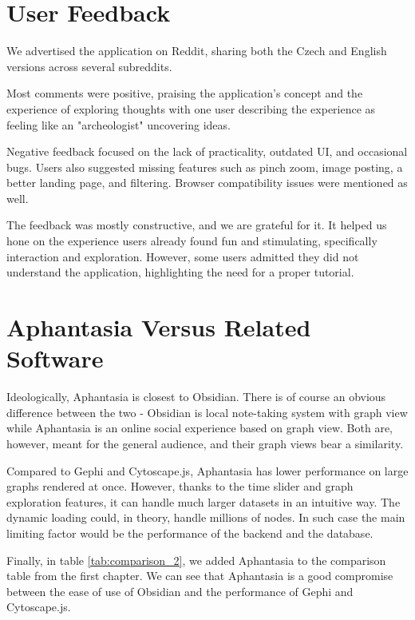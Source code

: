 \section{User Feedback}
We advertised the application on Reddit, sharing both the Czech and English versions across several subreddits.

Most comments were positive, praising the application's concept and the experience of exploring thoughts
with one user describing the experience as feeling like an "archeologist" uncovering ideas.

Negative feedback focused on the lack of practicality, outdated UI, and occasional bugs.
Users also suggested missing features such as pinch zoom, image posting, a better landing page, and filtering.
Browser compatibility issues were mentioned as well.

The feedback was mostly constructive, and we are grateful for it.
It helped us hone on the experience users already found fun and stimulating, specifically interaction and exploration.
However, some users admitted they did not understand the application, highlighting the need for a proper tutorial.

\section{Aphantasia Versus Related Software}

Ideologically, Aphantasia is closest to Obsidian.
There is of course an obvious difference between the two - Obsidian is local note-taking system with graph view while Aphantasia is an online social experience based on graph view.
Both are, however, meant for the general audience, and their graph views bear a similarity.

Compared to Gephi and Cytoscape.js, Aphantasia has lower performance on large graphs rendered at once.
However, thanks to the time slider and graph exploration features, it can handle much larger datasets in an intuitive way.
The dynamic loading could, in theory, handle millions of nodes. In such case the main limiting factor would be the performance of the backend and the database.

Finally, in table \ref{tab:comparison_2}, we added Aphantasia to the comparison table from the first chapter.
We can see that Aphantasia is a good compromise between the ease of use of Obsidian
and the performance of Gephi and Cytoscape.js.


